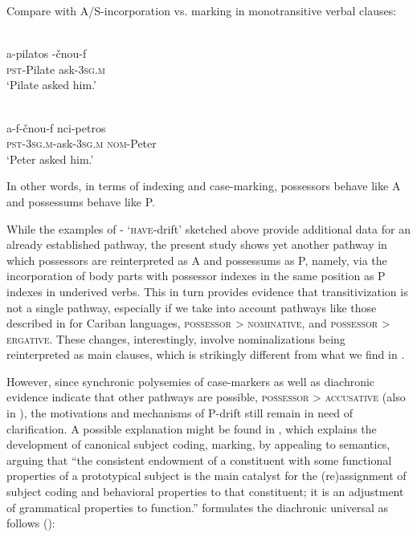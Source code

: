\documentclass[output=paper]{LSP/langsci}
\begin{document}
Compare with A/S-incorporation  vs.  marking  in monotransitive verbal clauses:

\begin{exe}
\ex%
\label{05-gr-ex:59}
\\
\gll a-pilatos -čnou-f\\
\textsc{pst}-Pilate ask-\textsc{3sg.m}\\
\glt ‘Pilate asked him.’ 
\end{exe}

\begin{exe}
\ex%
\label{05-gr-ex:60}
\\
\gll a-f-čnou-f nci-petros\\
\textsc{pst-3sg.m}-ask-\textsc{3sg.m} \textsc{nom}-Peter\\
\glt ‘Peter asked him.’  %
\end{exe}

In other words, in terms of indexing and case-marking,  possessors behave like A and possessums behave like P.

 While the examples of - ‘\textsc{have}-drift’ sketched above provide additional data for an already established pathway, the present study shows yet another pathway in which possessors are reinterpreted as A and possessums as P, namely, via the incorporation of body parts with possessor indexes in the same position as P indexes in underived verbs. This in turn provides evidence that transitivization is not a single pathway, especially if we take into account pathways like those described in \citet{Gildea1998Reconstructing} for Cariban languages, \eg \textsc{possessor > nominative}, and \textsc{possessor} > \textsc{ergative}. These changes, interestingly, involve nominalizations being reinterpreted as main clauses, which is strikingly different from what we find in . 

 However, since synchronic polysemies of case-markers as well as diachronic evidence indicate that other pathways are possible, \textsc{possessor} > \textsc{accusative} (also in \citealt{Gildea1998Reconstructing}), the motivations and mechanisms of P-drift still remain in need of clarification. A possible explanation might be found in \citet[303]{Serzant2013Rise}, which explains the development of canonical subject coding, \eg {} marking, by appealing to semantics, arguing that “the consistent endowment of a constituent with some functional properties of a prototypical subject is the main catalyst for the (re)assignment of subject coding and behavioral properties to that constituent; it is an adjustment of grammatical properties to function.” \citeauthor{Serzant2013Rise} formulates the diachronic universal as follows (\citeyear[303]{Serzant2013Rise}): 
\end{document}
